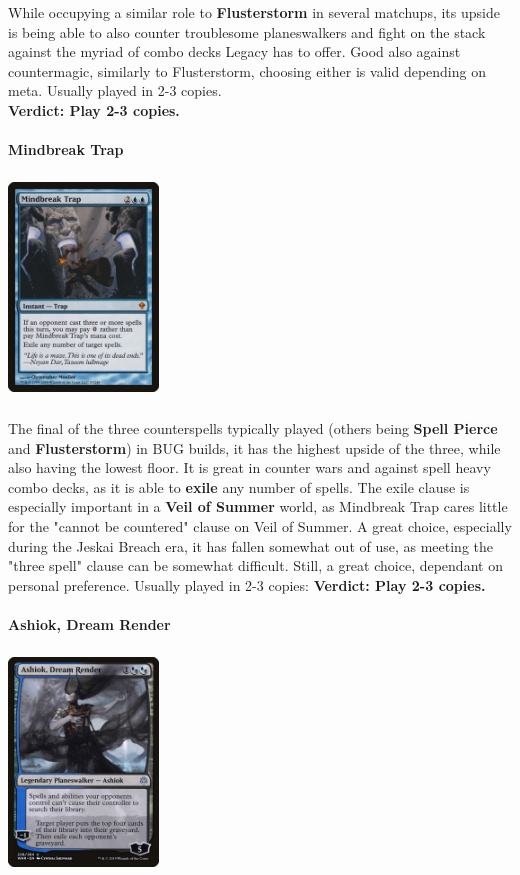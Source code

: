 \documentclass{report}
\begin{document}
While occupying a similar role to \textbf{Flusterstorm} in several matchups, its upside is being able to also counter troublesome planeswalkers and fight on the stack against the myriad of combo decks Legacy has to offer. Good also against countermagic, similarly to Flusterstorm, choosing either is valid depending on meta. Usually played in 2-3 copies.\\
\textbf{Verdict: Play 2-3 copies.\\\\}
\textbf{Mindbreak Trap\\}
\begin{center}
\includegraphics [width = 4cm, height = 6cm] {mindbreak-trap}
\end{center}
The final of the three counterspells typically played (others being \textbf{Spell Pierce} and \textbf{Flusterstorm}) in BUG builds, it has the highest upside of the three, while also having the lowest floor. It is great in counter wars and against spell heavy combo decks, as it is able to \textbf{exile} any number of spells. The exile clause is especially important in a \textbf{Veil of Summer} world, as Mindbreak Trap cares little for the "cannot be countered" clause on Veil of Summer. A great choice, especially during the Jeskai Breach era, it has fallen somewhat out of use, as meeting the "three spell" clause can be somewhat difficult. Still, a great choice, dependant on personal preference. Usually played in 2-3 copies:
\textbf{Verdict: Play 2-3 copies.\\\\}
\newpage
\textbf{Ashiok, Dream Render\\}
\begin{center}
\includegraphics [width = 4cm, height = 6cm] {ashiok-dream-render}
\end{center}
\end{document}
